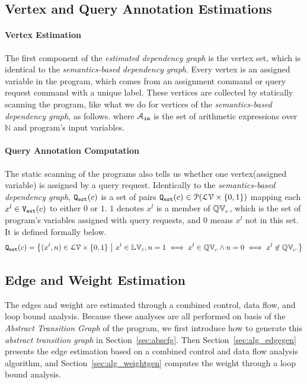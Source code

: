 \subsection{Vertex and Query Annotation Estimations}
\label{sec:alg_vertexgen}
\paragraph{Vertex Estimation}
The first component of the \emph{estimated dependency graph} is the vertex set, which is identical to the 
\emph{semantics-based dependency graph}.
Every vertex is an assigned variable in the program, which comes from an assignment command or query request command with a unique label. 
These vertices are collected by statically scanning the program, like what we do for vertices of the \emph{semantics-based dependency graph}, as follows.
%
where $\mathcal{A}_{\mathtt{in}}$ is the set of arithmetic expressions over $\mathbb{N}$ and program's input variables. 

\paragraph{Query Annotation Computation}
The static scanning of the programs also tells us whether one vertex(assigned variable) is assigned by a query request.
Identically to the 
\emph{semantics-based dependency graph}, $\mathtt{{Q_{est}}}(c)$ is
a set of pairs $\mathtt{{Q_{est}}}(c) \in \mathcal{P}(\mathcal{LV} \times \{0, 1\} )$ 
mapping each $x^l \in \mathtt{{V_{est}}}(c)$ to either $0$ or $1$. 
$1$ denotes $x^{l}$ is a member of $ \mathbb{QV}_{c}$, which is the set of program's variables assigned with query requests, 
and $0$ means $x^{l}$ not in this set. 
It is defined formally below.
%
\[\progF(c) =\left\{(x^l, n)  \in  \mathcal{LV} \times \{0, 1\} 
~ \middle\vert ~
x^l \in \lvar_{c},
n = 1 \iff x^l \in \qvar_{c} \land n = 0 \iff  x^l \not\in \qvar_{c} .
\right\}\]

\subsection{Edge and Weight Estimation}
\label{sec:alg_weightedgegen}
The edges and weight are estimated through a combined control, data flow, and loop bound analysis.
Because these analyses are all performed on basis of the \emph{Abstract Transition Graph} of the program, we first introduce how to generate this \emph{abstract transition graph} in Section~\ref{sec:abscfg}.
Then Section~\ref{sec:alg_edgegen} presents the edge estimation based on a combined control and data flow analysis algorithm,
and Section~\ref{sec:alg_weightgen}
computes the weight through a loop bound analysis.

